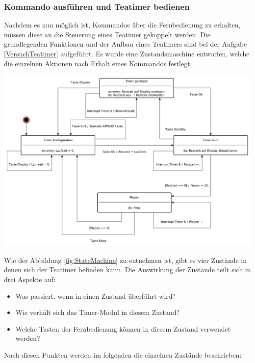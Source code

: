 \documentclass[12pt,a4paper,bibliography=totocnumbered,listof=totocnumbered]{scrartcl}
\begin{document}
\subsubsection{Kommando ausführen und Teatimer bedienen}
Nachdem es nun möglich ist, Kommandos über die Fernbedienung zu erhalten, müssen diese an die Steuerung eines Teatimer gekoppelt werden. Die grundlegenden Funktionen und der Aufbau eines Teatimers sind bei der Aufgabe \ref{VersuchTeatimer} aufgeführt.\newline
Es wurde eine Zustandsmaschine entworfen, welche die einzelnen Aktionen nach Erhalt eines Kommandos festlegt.

\vspace{1em}
\begin{minipage}{\linewidth}
	\centering
	\includegraphics[width=1\linewidth]{img/Zustandsdiagramm.pdf}
	\label{fig:StateMachine}
\end{minipage}

Wie der Abbildung \ref{fig:StateMachine} zu entnehmen ist, gibt es vier Zustände in denen sich der Teatimer befinden kann. Die Auswirkung der Zustände teilt sich in drei Aspekte auf:
\begin{itemize}
	\item Was passiert, wenn in einen Zustand überführt wird?
	\item Wie verhält sich das Timer-Modul in diesem Zustand?
	\item Welche Tasten der Fernbedienung können in diesem Zustand verwendet werden?
\end{itemize}

Nach diesen Punkten werden im folgenden die einzelnen Zustände beschrieben:
\end{document}

